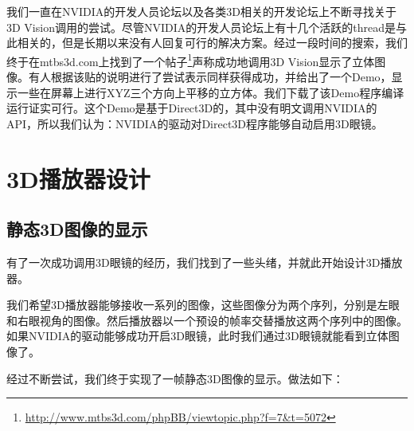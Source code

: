 
我们一直在NVIDIA的开发人员论坛以及各类3D相关的开发论坛上不断寻找关于3D Vision调用的尝试。尽管NVIDIA的开发人员论坛上有十几个活跃的thread是与此相关的，但是长期以来没有人回复可行的解决方案。经过一段时间的搜索，我们终于在mtbs3d.com上找到了一个帖子\footnote{\href{http://www.mtbs3d.com/phpBB/viewtopic.php?f=7&t=5072}{http://www.mtbs3d.com/phpBB/viewtopic.php?f=7\&t=5072}}声称成功地调用3D Vision显示了立体图像。有人根据该贴的说明进行了尝试表示同样获得成功，并给出了一个Demo，显示一些在屏幕上进行XYZ三个方向上平移的立方体。我们下载了该Demo程序编译运行证实可行。这个Demo是基于Direct3D的，其中没有明文调用NVIDIA的API，所以我们认为：NVIDIA的驱动对Direct3D程序能够自动启用3D眼镜。

\section{3D播放器设计}
\label{sec:3dplayerdesign}

\subsection{静态3D图像的显示}
\label{subsec:static3dimgdisp}

有了一次成功调用3D眼镜的经历，我们找到了一些头绪，并就此开始设计3D播放器。

我们希望3D播放器能够接收一系列的图像，这些图像分为两个序列，分别是左眼和右眼视角的图像。然后播放器以一个预设的帧率交替播放这两个序列中的图像。如果NVIDIA的驱动能够成功开启3D眼镜，此时我们通过3D眼镜就能看到立体图像了。

经过不断尝试，我们终于实现了一帧静态3D图像的显示。做法如下：

